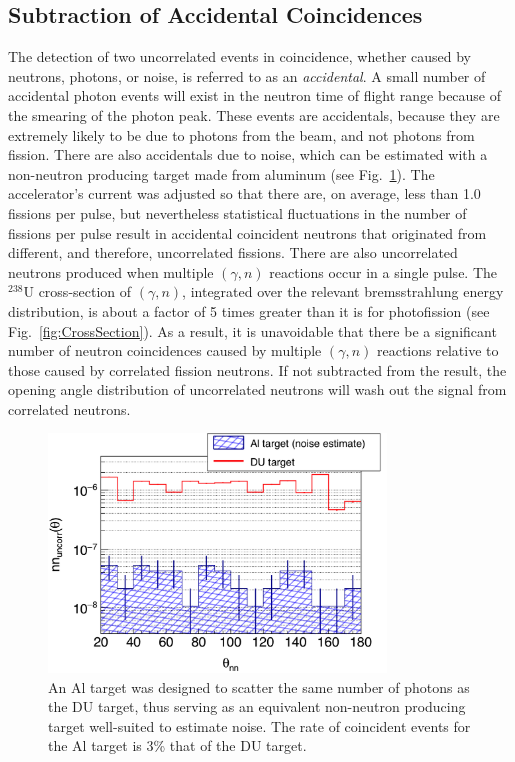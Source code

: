 \subsection{Subtraction of Accidental Coincidences}
\label{Reconstruction of Accidental Coincidence}
The detection of two uncorrelated events in coincidence, whether caused by neutrons, photons, or noise, is referred to as an \emph{accidental}.
A small number of accidental photon events will exist in the neutron time of flight range because of the smearing of the photon peak.
These events are accidentals, because they are extremely likely to be due to photons from the beam, and not photons from fission.
There are also accidentals due to noise, which can be estimated with a non-neutron producing target made from aluminum (see Fig.~\ref{fig:Noise}).
The accelerator's current was adjusted so that there are, on average, less than 1.0 fissions per pulse, but nevertheless statistical fluctuations in the number of fissions per pulse result in accidental coincident neutrons that originated from different, and therefore, uncorrelated fissions.
There are also uncorrelated neutrons produced when multiple $(\gamma, n)$ reactions occur in a single pulse.
The $^{238}$U cross-section of $(\gamma, n)$, integrated over the relevant bremsstrahlung energy distribution, is about a factor of 5 times greater than it is for photofission (see Fig.~\ref{fig:CrossSection}).
As a result, it is unavoidable that there be a significant number of neutron coincidences caused by multiple $(\gamma, n)$ reactions relative to those caused by correlated fission neutrons.
If not subtracted from the result, the opening angle distribution of uncorrelated neutrons will wash out the signal from correlated neutrons. 
\begin{figure}[]
\centering
    \includegraphics[width=0.8\textwidth]{Content/Methods/Noise.png}
    \caption{An Al target was designed to scatter the same number of photons as the DU target, thus serving as an equivalent non-neutron producing target well-suited to estimate noise.
    The rate of coincident events for the Al target is 3\% that of the DU target. 
        }
    \label{fig:Noise}
\end{figure}
